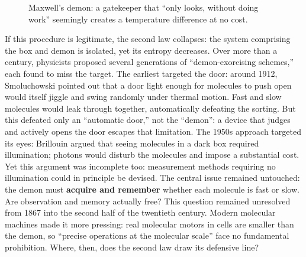 \begin{figure}[htbp]
\centering
{}
\caption{Maxwell's demon: a gatekeeper that ``only looks, without doing work'' seemingly creates a temperature difference at no cost.}
\end{figure}

If this procedure is legitimate, the second law collapses: the system comprising the box and demon is isolated, yet its entropy decreases. Over more than a century, physicists proposed several generations of ``demon-exorcising schemes,'' each found to miss the target. The earliest targeted the door: around 1912, Smoluchowski pointed out that a door light enough for molecules to push open would itself jiggle and swing randomly under thermal motion. Fast and slow molecules would leak through together, automatically defeating the sorting. But this defeated only an ``automatic door,'' not the ``demon'': a device that judges and actively opens the door escapes that limitation. The 1950s approach targeted its eyes: Brillouin argued that seeing molecules in a dark box required illumination; photons would disturb the molecules and impose a substantial cost. Yet this argument was incomplete too: measurement methods requiring no illumination could in principle be devised. The central issue remained untouched: the demon must \textbf{acquire and remember} whether each molecule is fast or slow. Are observation and memory actually free? This question remained unresolved from 1867 into the second half of the twentieth century. Modern molecular machines made it more pressing: real molecular motors in cells are smaller than the demon, so ``precise operations at the molecular scale'' face no fundamental prohibition. Where, then, does the second law draw its defensive line?

